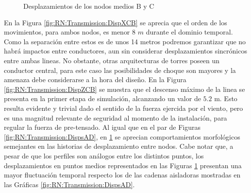 \begingroup
\centering
\begin{figure}[htbp]
	\centering
	\label{fig:RN:Transmission:DispXCB}
	\label{fig:RN:Transmission:DispZCB}
	\caption{Desplazamientos de los nodos medios B y C} \label{fig:RN:Transmission:DispsCB}
\end{figure}
\endgroup

En la Figura \ref{fig:RN:Transmission:DispXCB} se aprecia que el orden de los movimientos, para ambos nodos, es menor 8 $m$ durante el dominio temporal. Como la separación entre estos es de unos 14 metros podremos garantizar que no habrá impactos entre conductores, aun sin considerar desplazamientos sincrónicos entre ambas lineas. No obstante, otras arquitecturas de torres poseen un conductor central, para este caso las posibilidades de choque son mayores y la amenaza debe considerarse a la hora del diseño. En la Figura \ref{fig:RN:Transmission:DispZCB} se muestra que el descenso máximo de la linea se presenta en la primer etapa de simulación, alcanzando un valor de $5.2$ m. Esto resulta evidente y trivial dado el sentido de la fuerza ejercida por el viento, pero es una magnitud relevante de seguridad al momento de la instalación, para regular la fuerza de pre-tensado. Al igual que en el par de Figuras \ref{fig:RN:Transmission:DispsAD}, en \ref{fig:RN:Transmission:DispsCB} se aprecian comportamientos morfológicos semejantes en las historias de desplazamiento entre nodos. Cabe notar que, a pesar de que los perfiles son análogos entre los distintos puntos, los desplazamientos en puntos medios representados en las Figuras \ref{fig:RN:Transmission:DispsCB} presentan una mayor fluctuación temporal respecto los de las cadenas aisladoras mostradas en las Gráficas \ref{fig:RN:Transmission:DispsAD}.

